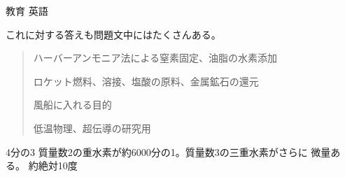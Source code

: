 \documentclass[fleqn]{jbook}
\begin{document}
\begin{answer}{教育 英語}{}
\begin{subanswers}
\begin{subsubanswers}
 \SubSubAnswer
 これに対する答えも問題文中にはたくさんある。
 \begin{quote}
 ハーバーアンモニア法による窒素固定、油脂の水素添加 
 \par
 ロケット燃料、溶接、塩酸の原料、金属鉱石の還元 
 \par
 風船に入れる目的 
 \par
 低温物理、超伝導の研究用
 \end{quote} 

 \SubSubAnswer 
  4分の3
 \SubSubAnswer 
  質量数2の重水素が約6000分の1。質量数3の三重水素がさらに
 微量ある。
 \SubSubAnswer
  約絶対10度

\end{subsubanswers}
\end{subanswers}
\end{answer}
\end{document}
